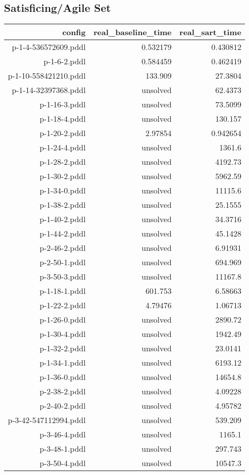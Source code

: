 \documentclass{article}
\begin{document}
                    
                    \subsection*{Satisficing/Agile Set}
                    
                            \begin{center}
                            \scriptsize
                            \begin{tabular}{r|r|r}
                            config & real\_baseline\_time & real\_sart\_time\\\midrule
                             p-1-4-536572609.pddl&0.532179&0.430812\\
 p-1-6-2.pddl&0.584459&0.462419\\
 p-1-10-558421210.pddl&133.909&27.3804\\
 p-1-14-32397368.pddl&unsolved&62.4373\\
 p-1-16-3.pddl&unsolved&73.5099\\
 p-1-18-4.pddl&unsolved&130.157\\
 p-1-20-2.pddl&2.97854&0.942654\\
 p-1-24-4.pddl&unsolved&1361.6\\
 p-1-28-2.pddl&unsolved&4192.73\\
 p-1-30-2.pddl&unsolved&5962.59\\
 p-1-34-0.pddl&unsolved&11115.6\\
 p-1-38-2.pddl&unsolved&25.1555\\
 p-1-40-2.pddl&unsolved&34.3716\\
 p-1-44-2.pddl&unsolved&45.1428\\
 p-2-46-2.pddl&unsolved&6.91931\\
 p-2-50-1.pddl&unsolved&694.969\\
 p-3-50-3.pddl&unsolved&11167.8\\
 p-1-18-1.pddl&601.753&6.58663\\
 p-1-22-2.pddl&4.79476&1.06713\\
 p-1-26-0.pddl&unsolved&2890.72\\
 p-1-30-4.pddl&unsolved&1942.49\\
 p-1-32-2.pddl&unsolved&23.0141\\
 p-1-34-1.pddl&unsolved&6193.12\\
 p-1-36-0.pddl&unsolved&14654.8\\
 p-2-38-2.pddl&unsolved&4.09228\\
 p-2-40-2.pddl&unsolved&4.95782\\
 p-3-42-547112994.pddl&unsolved&539.209\\
 p-3-46-4.pddl&unsolved&1165.1\\
 p-3-48-1.pddl&unsolved&297.743\\
 p-3-50-4.pddl&unsolved&10547.3
                            \end{tabular}
                            \end{center}
                    
\end{document}
